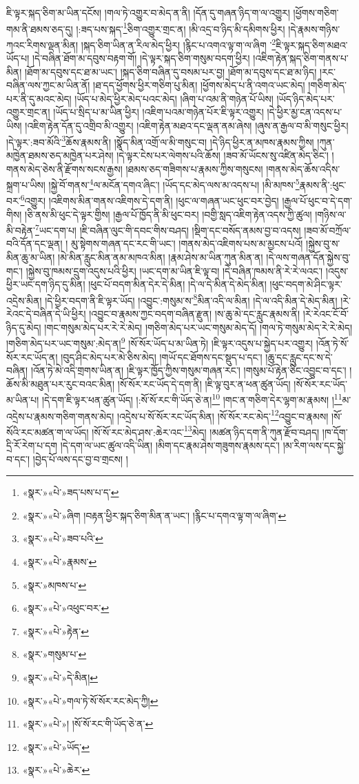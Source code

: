 \documentclass[12pt,a4paper]{book}
\begin{document}
ཇི་ལྟར་སྐད་ཅིག་མ་ཡིན་དངོས། །གལ་ཏེ་འགྱུར་བ་མེད་ན་ནི། །དོན་དུ་གཞན་ཉིད་ག་ལ་འགྱུར། །ཕྱོགས་གཅིག་གམ་ནི་ཐམས་ཅད་དུ། །:ཟད་པས་སྐད་\footnote{«སྣར་»«པེ་»ཟད་པས་པ་ད་}ཅིག་འགྱུར་གྲང་ན། །མི་འདྲ་བ་ཉིད་མི་དམིགས་ཕྱིར། །དེ་རྣམས་གཉིས་ཀའང་རིགས་ལྡན་མིན། །སྐད་ཅིག་ཡིན་ན་རིལ་མེད་ཕྱིར། །རྙིང་པ་འགའ་ལྟ་ག་ལ་ཞིག ་\footnote{«སྣར་»«པེ་»ཞིག །བརྟན་ཕྱིར་སྐད་ཅིག་མིན་ན་ཡང་། །རྙིང་པ་དགའ་ལྟ་ག་ལ་ཞིག་}ཇི་ལྟར་སྐད་ཅིག་མཐའ་ཡོད་པ། །དེ་བཞིན་ཐོག་མ་དབུས་བརྟག་གོ། །དེ་ལྟར་སྐད་ཅིག་གསུམ་བདག་ཕྱིར། །འཇིག་རྟེན་སྐད་ཅིག་གནས་པ་མིན། །ཐོག་མ་དབུས་དང་ཐ་མ་ཡང་། །སྐད་ཅིག་བཞིན་དུ་བསམ་པར་བྱ། །ཐོག་མ་དབུས་དང་ཐ་མ་ཉིད། །རང་བཞིན་ལས་ཀྱང་མ་ཡིན་ནོ། །ཐ་དད་ཕྱོགས་ཕྱིར་གཅིག་པུ་མིན། །ཕྱོགས་མེད་པ་ནི་འགའ་ཡང་མེད། །གཅིག་མེད་པར་ནི་དུ་མའང་མེད། །ཡོད་པ་མེད་ཕྱིར་མེད་པའང་མེད། །ཞིག་པ་འམ་ནི་གཉེན་པོ་ཡིས། །ཡོད་ཉིད་མེད་པར་འགྱུར་གྲང་ན། །ཡོད་པ་སྲིད་པ་མ་ཡིན་ཕྱིར། །འཇིག་པའམ་གཉེན་པོར་ཇི་ལྟར་འགྱུར། །དེ་ཕྱིར་མྱ་ངན་འདས་པ་ཡིས། །འཇིག་རྟེན་དོན་དུ་འགྲིབ་མི་འགྱུར། །འཇིག་རྟེན་མཐའ་དང་ལྡན་ནམ་ཞེས། །ཞུས་ན་རྒྱལ་བ་མི་གསུང་ཕྱིར། །དེ་ལྟར་:ཟབ་མོའི་\footnote{«སྣར་»«པེ་»ཟབ་པའི་}ཆོས་རྣམས་ནི། །སྣོད་མིན་འགྲོ་ལ་མི་གསུང་བ། །དེ་ཉིད་ཕྱིར་ན་མཁས་རྣམས་ཀྱིས། །ཀུན་མཁྱེན་ཐམས་ཅད་མཁྱེན་པར་ཤེས། །དེ་ལྟར་ངེས་པར་ལེགས་པའི་ཆོས། །ཟབ་མོ་ཡོངས་སུ་འཛིན་མེད་ཅིང་། །གནས་མེད་ཅེས་ནི་རྫོགས་སངས་རྒྱས། །ཐམས་ཅད་གཟིགས་པ་རྣམས་ཀྱིས་གསུངས། །གནས་མེད་ཆོས་འདིས་སྐྲག་པ་ཡིས། །སྐྱེ་བོ་གནས་\footnote{«སྣར་»«པེ་»རྣམས་}ལ་མངོན་དགའ་ཞིང་། །ཡོད་དང་མེད་ལས་མ་འདས་པ། །མི་མཁས་\footnote{«སྣར་»མཁས་པ་}རྣམས་ནི་:ཕུང་བར་\footnote{«སྣར་»«པེ་»འཕུང་བར་}འགྱུར། །འཇིགས་མིན་གནས་འཇིགས་དེ་དག་ནི། །ཕུང་ལ་གཞན་ཡང་ཕུང་བར་བྱེད། །རྒྱལ་པོ་ཕུང་བ་དེ་དག་གིས། །ཅི་ནས་མི་ཕུང་དེ་ལྟར་གྱིས། །རྒྱལ་པོ་ཁྱོད་ནི་མི་ཕུང་བར། །བགྱི་སླད་འཇིག་རྟེན་འདས་ཀྱི་ཚུལ། །གཉིས་ལ་མི་བརྟེན་\footnote{«སྣར་»«པེ་»རྟེན་}ཡང་དག་པ། །ཇི་བཞིན་ལུང་གི་དབང་གིས་བཤད། །སྡིག་དང་བསོད་ནམས་བྱ་བ་འདས། །ཟབ་མོ་བཀྲོལ་བའི་དོན་དང་ལྡན། །
མུ་སྟེགས་གཞན་དང་རང་གི་ཡང་། །གནས་མེད་འཇིགས་པས་མ་མྱངས་པའོ། །སྐྱེས་བུ་ས་མིན་ཆུ་མ་ཡིན། །མེ་མིན་རླུང་མིན་ནམ་མཁའ་མིན། །རྣམ་ཤེས་མ་ཡིན་ཀུན་མིན་ན། །དེ་ལས་གཞན་དོན་སྐྱེས་བུ་གང་། །སྐྱེས་བུ་ཁམས་དྲུག་འདུས་པའི་ཕྱིར། །ཡང་དག་མ་ཡིན་ཇི་ལྟ་བ། །དེ་བཞིན་ཁམས་ནི་རེ་རེ་ལའང་། །འདུས་ཕྱིར་ཡང་དག་ཉིད་དུ་མིན། །ཕུང་པོ་བདག་མིན་དེར་དེ་མིན། །དེ་ལ་དེ་མིན་དེ་མེད་མིན། །ཕུང་བདག་མེ་ཤིང་ལྟར་འདྲེས་མིན། །དེ་ཕྱིར་བདག་ནི་ཇི་ལྟར་ཡོད། །འབྱུང་:གསུམ་ས་\footnote{«སྣར་»གསུམ་པ་}མིན་འདི་ལ་མིན། །དེ་ལ་འདི་མིན་དེ་མེད་མིན། །རེ་རེའང་དེ་བཞིན་དེ་ཡི་ཕྱིར། །འབྱུང་བ་རྣམས་ཀྱང་བདག་བཞིན་རྫུན། །ས་ཆུ་མེ་དང་རླུང་རྣམས་ནི། །རེ་རེའང་ངོ་བོ་ཉིད་དུ་མེད། །གང་གསུམ་མེད་པར་རེ་རེ་མེད། །གཅིག་མེད་པར་ཡང་གསུམ་མེད་དོ། །གལ་ཏེ་གསུམ་མེད་རེ་རེ་མེད། །གཅིག་མེད་པར་ཡང་གསུམ་:མེད་ན།\footnote{«སྣར་»«པེ་»དེ་མིན།} །སོ་སོར་ཡོད་པ་མ་ཡིན་ཏེ། །ཇི་ལྟར་འདུས་པ་སྐྱེད་པར་འགྱུར། །འོན་ཏེ་སོ་སོར་རང་ཡོད་ན། །བུད་ཤིང་མེད་པར་མེ་ཅིས་མེད། །གཡོ་དང་ཐོགས་དང་སྡུད་པ་དང་། །ཆུ་དང་རླུང་དང་ས་དེ་བཞིན། །འོན་ཏེ་མེ་འདི་གྲགས་ཡིན་ན། །ཇི་ལྟར་ཁྱོད་ཀྱིས་གསུམ་གཞན་རང་། །གསུམ་པོ་རྟེན་ཅིང་འབྱུང་བ་དང་། །ཆོས་མི་མཐུན་པར་རུང་བའང་མིན། །སོ་སོར་རང་ཡོད་དེ་དག་ནི། །ཇི་ལྟ་བུར་ན་ཕན་ཚུན་ཡོད། །སོ་སོར་རང་ཡོད་མ་ཡིན་པ། །དེ་དག་ཇི་ལྟར་ཕན་ཚུན་ཡོད། །:སོ་སོ་རང་གི་ཡོད་ཅེ་ན།\footnote{«སྣར་»«པེ་»གལ་ཏེ་སོ་སོར་རང་མེད་ཀྱི།} །གང་ན་གཅིག་དེར་ལྷག་མ་རྣམས། །\footnote{«སྣར་»«པེ་»། །སོ་སོ་རང་གི་ཡོད་ཅེ་ན་}མ་འདྲེས་པ་རྣམས་གཅིག་གནས་མེད། །འདྲེས་པ་སོ་སོར་རང་ཡོད་མིན། །སོ་སོར་རང་མེད་\footnote{«སྣར་»«པེ་»ཡོད་}འབྱུང་བ་རྣམས། །སོ་སོའི་རང་མཚན་ག་ལ་ཡོད། །སོ་སོ་རང་མེད་ཤས་:ཆེར་འང་\footnote{«སྣར་»«པེ་»ཆེར་}མེད། །མཚན་ཉིད་དག་ནི་ཀུན་རྫོབ་བཤད། །ཁ་དོག་དྲི་རོ་རེག་པ་དག །དེ་དག་ལ་ཡང་ཚུལ་འདི་ཡིན། །མིག་དང་རྣམ་ཤེས་གཟུགས་རྣམས་དང་། །མ་རིག་ལས་དང་སྐྱེ་བ་དང་། །བྱེད་པོ་ལས་དང་བྱ་བ་གྲངས། །
\end{document}
